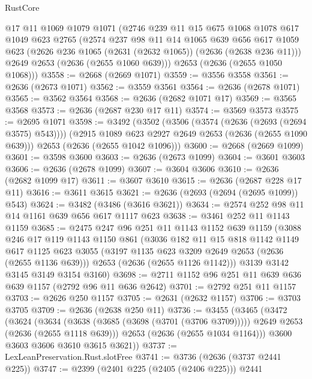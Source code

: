 \begin{lexlean}{RustCore}
\begin{coremodule}
    @17
    @11
    @1069
    @1079
    @1071
    (@2746
      @239
      @11
      @15
      @675
      @1068
      @1078
      @617
      @1049
      @623
      @2765
      (@2574
        @237
        @98
        @11
        @14
        @1065
        @639
        @656
        @617
        @1059
        @623
        (@2626 @236 @1065 (@2631 (@2632 @1065)) (@2636 (@2638 @236 @11)))
        @2649
        @2653
        (@2636 (@2655 @1060 @639)))
      @2653
      (@2636 (@2655 @1050 @1068)))
@3558 := @2668 (@2669 @1071)
@3559 := @3556 @3558
@3561 := @2636 (@2673 @1071)
@3562 := @3559 @3561
@3564 := @2636 (@2678 @1071)
@3565 := @3562 @3564
@3568 := @2636 (@2682 @1071 @17)
@3569 := @3565 @3568
@3573 := @2636 (@2687 @230 @17 @11)
@3574 := @3569 @3573
@3575 := @2695 @1071
@3598 := @3492
    (@3502
      (@3506 (@3574 (@2636 (@2693 (@2694 @3575) @543))))
      (@2915 @1089 @623 @2927 @2649 @2653 (@2636 (@2655 @1090 @639)))
      @2653
      (@2636 (@2655 @1042 @1096)))
@3600 := @2668 (@2669 @1099)
@3601 := @3598 @3600
@3603 := @2636 (@2673 @1099)
@3604 := @3601 @3603
@3606 := @2636 (@2678 @1099)
@3607 := @3604 @3606
@3610 := @2636 (@2682 @1099 @17)
@3611 := @3607 @3610
@3615 := @2636 (@2687 @228 @17 @11)
@3616 := @3611 @3615
@3621 := @2636 (@2693 (@2694 (@2695 @1099)) @543)
@3624 := @3482 (@3486 (@3616 @3621))
@3634 := @2574 @252 @98 @11 @14 @1161 @639 @656 @617 @1117 @623
@3638 := @3461 @252 @11 @1143 @1159
@3685 := @2475
    @247
    @96
    @251
    @11
    @1143
    @1152
    @639
    @1159
    (@3088
      @246
      @17
      @119
      @1143
      @1150
      @861
      (@3036
        @182
        @11
        @15
        @818
        @1142
        @1149
        @617
        @1125
        @623
        @3055
        (@3197 @1135 @623 @3209 @2649 @2653 (@2636 (@2655 @1136 @639)))
        @2653
        (@2636 (@2655 @1126 @1142)))
      @3139
      @3142
      @3145
      @3149
      @3154
      @3160)
@3698 := @2711 @1152 @96 @251 @11 @639 @636 @639 @1157 (@2792 @96 @11 @636 @2642)
@3701 := @2792 @251 @11 @1157
@3703 := @2626 @250 @1157
@3705 := @2631 (@2632 @1157)
@3706 := @3703 @3705
@3709 := @2636 (@2638 @250 @11)
@3736 := @3455
    (@3465
      (@3472
        (@3624
          (@3634
            (@3638 (@3685 (@3698 (@3701 (@3706 @3709)))))
            @2649
            @2653
            (@2636 (@2655 @1118 @639)))
          @2653
          (@2636 (@2655 @1034 @1164)))
        @3600
        @3603
        @3606
        @3610
        @3615
        @3621))
@3737 := LexLeanPreservation.Rust.slotFree
@3741 := @3736 (@2636 (@3737 @2441 @225))
@3747 := @2399 (@2401 @225 (@2405 (@2406 @225))) @2441

\end{coremodule}
\end{lexlean}
